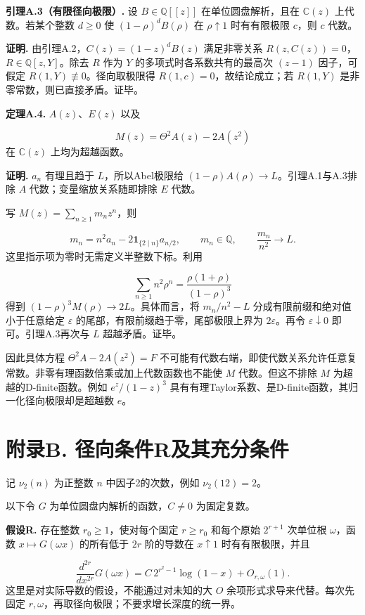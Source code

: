 \documentclass[12pt,a4paper]{article}
\begin{document}
\textbf{引理A.3（有限径向极限）.} 设 $B\in\mathbb Q[[z]]$ 在单位圆盘解析，且在 $\mathbb C(z)$ 上代数。若某个整数 $d\ge0$ 使 $(1-\rho)^dB(\rho)$ 在 $\rho\uparrow1$ 时有有限极限 $c$，则 $c$ 代数。

\textbf{证明.} 由引理A.2，$C(z)=(1-z)^dB(z)$ 满足非零关系 $R(z,C(z))=0$，$R\in\mathbb Q[z,Y]$。除去 $R$ 作为 $Y$ 的多项式时各系数共有的最高次 $(z-1)$ 因子，可假定 $R(1,Y)\not\equiv0$。径向取极限得 $R(1,c)=0$，故结论成立；若 $R(1,Y)$ 是非零常数，则已直接矛盾。证毕。

\textbf{定理A.4.} $A(z)$、$E(z)$ 以及

\[
M(z)=\Theta^2A(z)-2A(z^2)
\]
在 $\mathbb C(z)$ 上均为超越函数。

\textbf{证明.} $a_n$ 有理且趋于 $L$，所以Abel极限给 $(1-\rho)A(\rho)\to L$。引理A.1与A.3排除 $A$ 代数；变量缩放关系随即排除 $E$ 代数。

写 $M(z)=\sum_{n\ge1}m_nz^n$，则

\[
m_n=n^2a_n-2\mathbf1_{\{2\mid n\}}a_{n/2},\qquad m_n\in\mathbb Q,\qquad \frac{m_n}{n^2}\longrightarrow L.
\]
这里指示项为零时无需定义半整数下标。利用

\[
\sum_{n\ge1}n^2\rho^n=\frac{\rho(1+\rho)}{(1-\rho)^3}
\]
得到 $(1-\rho)^3M(\rho)\to2L$。具体而言，将 $m_n/n^2-L$ 分成有限前缀和绝对值小于任意给定 $\varepsilon$ 的尾部，有限前缀趋于零，尾部极限上界为 $2\varepsilon$。再令 $\varepsilon\downarrow0$ 即可。引理A.3再次与 $L$ 超越矛盾。证毕。

因此具体方程 $\Theta^2A-2A(z^2)=F$ 不可能有代数右端，即使代数关系允许任意复常数。非零有理函数倍乘或加上代数函数也不能使 $M$ 代数。但这不排除 $M$ 为超越的D-finite函数。例如 $e^z/(1-z)^3$ 具有有理Taylor系数、是D-finite函数，其归一化径向极限却是超越数 $e$。

\section*{附录B. 径向条件R及其充分条件}
记 $\nu_2(n)$ 为正整数 $n$ 中因子2的次数，例如 $\nu_2(12)=2$。

以下令 $G$ 为单位圆盘内解析的函数，$C\ne0$ 为固定复数。

\textbf{假设R.} 存在整数 $r_0\ge1$，使对每个固定 $r\ge r_0$ 和每个原始 $2^{r+1}$ 次单位根 $\omega$，函数 $x\mapsto G(\omega x)$ 的所有低于 $2r$ 阶的导数在 $x\uparrow1$ 时有有限极限，并且

\[
\frac{d^{2r}}{dx^{2r}}G(\omega x)=C\,2^{r^2-1}\log(1-x)+O_{r,\omega}(1).
\]
这里是对实际导数的假设，不能通过对未知的大 $O$ 余项形式求导来代替。每次先固定 $r,\omega$，再取径向极限；不要求增长深度的统一界。
\end{document}
